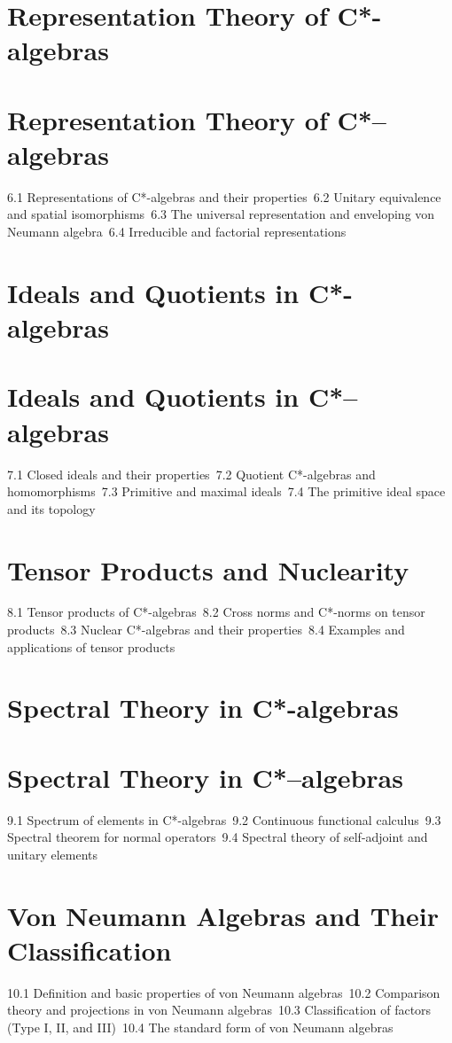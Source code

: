 \section{Representation Theory of C*-algebras}
\section{Representation Theory of C*–algebras}
6.1 Representations of C*-algebras and their properties\
6.2 Unitary equivalence and spatial isomorphisms\
6.3 The universal representation and enveloping von Neumann algebra\
6.4 Irreducible and factorial representations\
\section{Ideals and Quotients in C*-algebras}
\section{Ideals and Quotients in C*–algebras}
7.1 Closed ideals and their properties\
7.2 Quotient C*-algebras and homomorphisms\
7.3 Primitive and maximal ideals\
7.4 The primitive ideal space and its topology\
\section{Tensor Products and Nuclearity}
8.1 Tensor products of C*-algebras\
8.2 Cross norms and C*-norms on tensor products\
8.3 Nuclear C*-algebras and their properties\
8.4 Examples and applications of tensor products\
\section{Spectral Theory in C*-algebras}
\section{Spectral Theory in C*–algebras}
9.1 Spectrum of elements in C*-algebras\
9.2 Continuous functional calculus\
9.3 Spectral theorem for normal operators\
9.4 Spectral theory of self-adjoint and unitary elements\
\section{Von Neumann Algebras and Their Classification}
10.1 Definition and basic properties of von Neumann algebras\
10.2 Comparison theory and projections in von Neumann algebras\
10.3 Classification of factors (Type I, II, and III)\
10.4 The standard form of von Neumann algebras\
